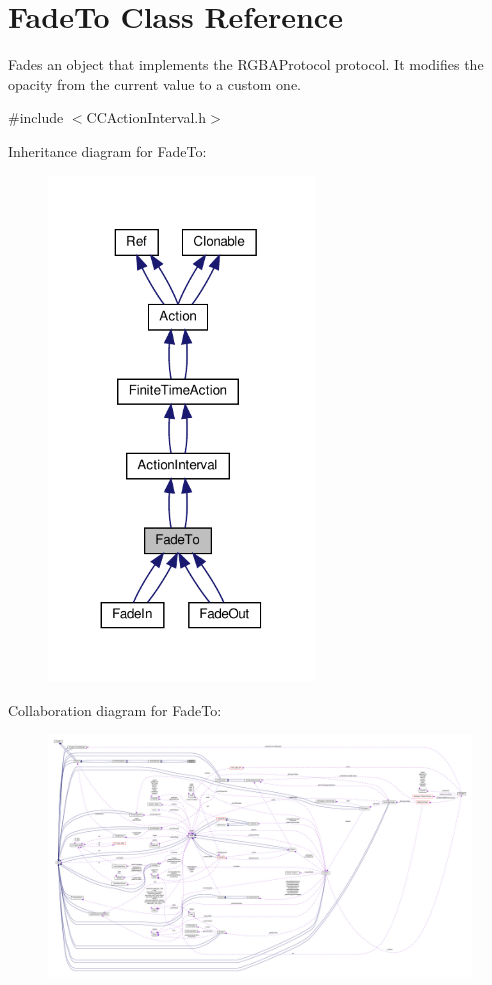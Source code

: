 \hypertarget{classFadeTo}{}\section{Fade\+To Class Reference}
\label{classFadeTo}


Fades an object that implements the R\+G\+B\+A\+Protocol protocol. It modifies the opacity from the current value to a custom one.  




{\ttfamily \#include $<$C\+C\+Action\+Interval.\+h$>$}



Inheritance diagram for Fade\+To\+:
\nopagebreak
\begin{figure}[H]
\begin{center}
\leavevmode
\includegraphics[width=200pt]{classFadeTo__inherit__graph}
\end{center}
\end{figure}


Collaboration diagram for Fade\+To\+:
\nopagebreak
\begin{figure}[H]
\begin{center}
\leavevmode
\includegraphics[width=350pt]{classFadeTo__coll__graph}
\end{center}
\end{figure}
